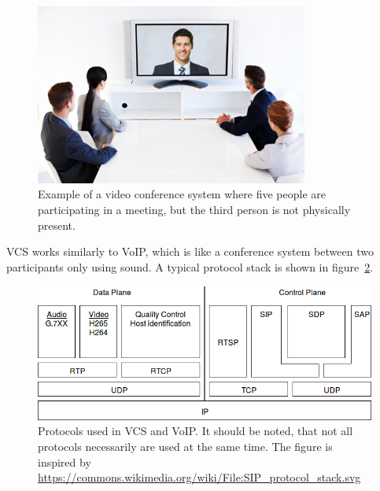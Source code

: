 \begin{figure}[H]
	\centering
	\includegraphics[width=0.8\textwidth]{figures/vcs_overview.png}
	\caption{Example of a video conference system where five people are participating in a meeting, but the third person is not physically present.} \label{fig:design:vcs}
\end{figure}

\ac{VCS} works similarly to \ac{VoIP}, which is like a conference system between two participants only using sound. A typical protocol stack is shown in figure~\ref{fig:design:protocolstack}. 

\begin{figure}[H]
	\centering
	\includegraphics[width=\textwidth]{figures/protocol_stack}
	\caption{Protocols used in VCS and VoIP. It should be noted, that not all protocols necessarily are used at the same time. The figure is inspired by \url{https://commons.wikimedia.org/wiki/File:SIP_protocol_stack.svg}}
	\label{fig:design:protocolstack}
\end{figure} 

